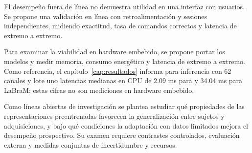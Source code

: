 El desempeño fuera de línea no demuestra utilidad en una interfaz con usuarios. Se propone una validación en línea con retroalimentación y sesiones independientes, midiendo exactitud, tasa de comandos correctos y latencia de extremo a extremo.

Para examinar la viabilidad en hardware embebido, se propone portar los modelos y medir memoria, consumo energético y latencia de extremo a extremo. Como referencia, el capítulo~\ref{cap:resultados} informa para inferencia con 62 canales y lote uno latencias medianas en CPU de 2.09 ms para \eegnet{} y 34.04 ms para LaBraM; estas cifras no son mediciones en hardware embebido.

Como líneas abiertas de investigación se plantea estudiar qué propiedades de las representaciones preentrenadas favorecen la generalización entre sujetos y adquisiciones, y bajo qué condiciones la adaptación con datos limitados mejora el desempeño prospectivo. Su examen requiere contrastes controlados, evaluación externa y medidas conjuntas de incertidumbre y recursos.

